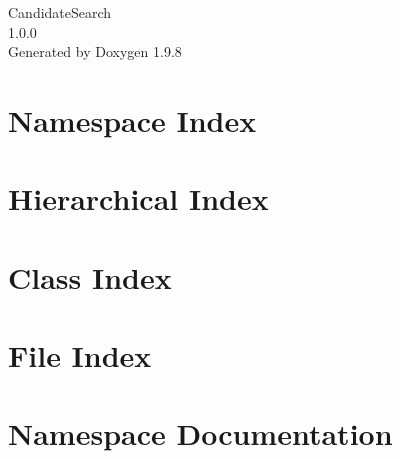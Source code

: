 \documentclass[twoside]{book}
\newcommand{\+}{\discretionary{\mbox{\scriptsize$\hookleftarrow$}}{}{}}
\newcommand{\clearemptydoublepage}{%
    \newpage{\pagestyle{empty}\cleardoublepage}%
  }
\begin{document}
  \raggedbottom
    \hypersetup{pageanchor=false,
                bookmarksnumbered=true,
                pdfencoding=unicode
               }
  \begin{titlepage}
  \vspace*{7cm}
  \begin{center}%
  {\Large Candidate\+Search}\\
  [1ex]\large 1.\+0.\+0 \\
  \vspace*{1cm}
  {\large Generated by Doxygen 1.9.8}\\
  \end{center}
  \end{titlepage}
  \clearemptydoublepage
  \tableofcontents
  \clearemptydoublepage
  \hypersetup{pageanchor=true}

\chapter{Namespace Index}

\chapter{Hierarchical Index}

\chapter{Class Index}

\chapter{File Index}

\chapter{Namespace Documentation}







\end{document}
